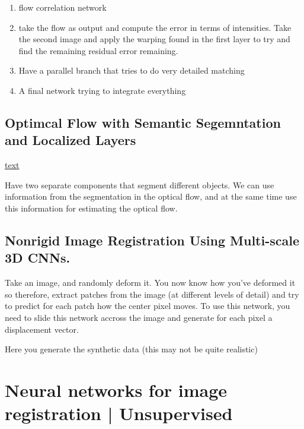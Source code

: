 \documentclass[11pt]{article}
\begin{document}
\begin{enumerate}
    \item flow correlation network
    \item take the flow as output and compute the error in terms of intensities. Take the second image and apply the warping found in the first layer to try and find the remaining residual error remaining. 
    \item Have a parallel branch that tries to do very detailed matching
    \item A final network trying to integrate everything
\end{enumerate}

\subsection{Optimcal Flow with Semantic Segemntation and Localized Layers}

\href{https://arxiv.org/abs/1603.03911}{text}

Have two separate components that segment different objects. We can use information from the segmentation in the optical flow, and at the same time use this information for estimating the optical flow.

\subsection{Nonrigid Image Registration Using Multi-scale 3D CNNs.}

\begin{figure}[H]
    \centering
\end{figure}

Take an image, and randomly deform it. You now know how you've deformed it so therefore, extract patches from the image (at different levels of detail) and try to predict for each patch how the center pixel moves. To use this network, you need to slide this network accross the image and generate for each pixel a displacement vector.

Here you generate the synthetic data (this may not be quite realistic)

\section{Neural networks for image registration | Unsupervised}
\end{document}
